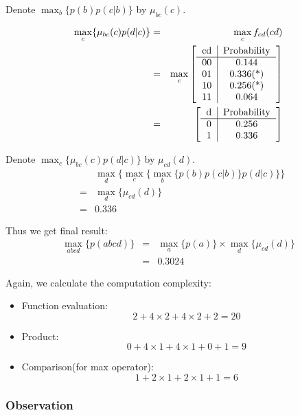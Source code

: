 \documentclass[11pt,a4paper]{article}
\begin{document}
Denote $\max_{b} \{p(b)p(c|b) \}$ by $\mu_{bc}(c)$. 

\begin{eqnarray}
	\max_{c} \{\mu_{bc}(c) p(d|c)\} &=& 
	\max_{c} f_{cd}(cd) \\
&=&\max_{c} \left[ 
\begin{tabular}{c|c}
cd & Probability \\
\hline
00 & 0.144 \\
01 & 0.336(*) \\
10 & 0.256(*) \\ 
11 & 0.064 \\
\end{tabular} \right] \\
&=&\left[ 
\begin{tabular}{c|c}
d & Probability \\
\hline
0 & 0.256 \\ 
1 & 0.336 
\end{tabular} \right]
\end{eqnarray}

Denote $\max_{c} \{\mu_{bc}(c) p(d|c)\}$ by $\mu_{cd}(d)$. 
\begin{eqnarray}
&& \max_{d} \{ \max_{c} \{\max_{b} \{p(b)p(c|b) \} p(d|c)\} \}  \\
&=& \max_{d}\{\mu_{cd}(d)\} \\
&=& 0.336 
\end{eqnarray}

Thus we get final result:
\begin{eqnarray}
\max_{abcd} \{ p(abcd) \} &=& \max_{a} \{ p(a) \} \times \max_{d}\{\mu_{cd}(d)\} \\
&=& 0.3024 
\end{eqnarray}

Again, we calculate the computation complexity:
\begin{itemize}
	\item Function evaluation: 
	$$
	2 + 4 \times 2 + 4 \times 2 + 2 = 20
	$$
	\item Product: 
	$$
	0 + 4 \times 1 + 4 \times 1 + 0 + 1 = 9
	$$
	\item Comparison(for max operator): 
	$$
	1 + 2 \times 1 + 2 \times 1 + 1 = 6
	$$
\end{itemize}

\subsubsection{Observation}
\end{document}
